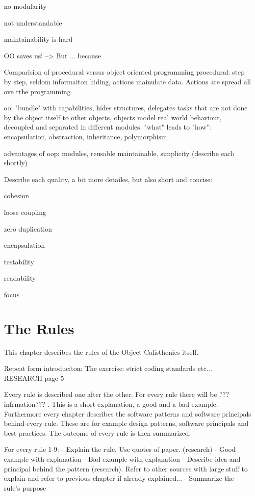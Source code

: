 no modularity

not understandable

maintainability is hard

OO saves us! --> But ... because

Comparision of procedural versus object oriented programming
procedural: step by step, seldom informaiton hiding, actions mainulate data. Actions are spread all ove rthe programming

oo: "bundle" with capabilities, hides structures, delegates tasks that are not done by the object itself to other objects, objects model real world behaviour, decoupled and separated in different modules. "what" leads to "how": encapsulation, abstraction, inheritance, polymorphism

advantages of oop: modules, reusable maintainable, simplicity (describe each shortly) 

Describe each quality, a bit more detailes, but also short and concise: 

cohesion

loose coupling

zero duplication

encapsulation

testability

readability

focus

\section{The Rules}
This chapter describes the rules of the Object Calisthenics itself. 

Repeat form introduciton:
The exercise: strict coding standards etc... RESEARCH page 5

Every rule is described one after the other. For every rule there will be ??? infrmation??? . This is a short explanation, a good and a bad example. Furthermore every chapter describes the software patterns and software principals behind every rule. These are for example design patterns, software principals and best practices. The outcome of every rule is then summarized.

For every rule 1-9: 
 - Explain the rule. Use quotes of paper. (research)
 - Good example with explanation
 - Bad example with explanation
 - Describe idea and principal behind the pattern (research). Refer to other sources with large stuff to explain and refer to previous chapter if already explained...
 - Summarize the rule's purpose

